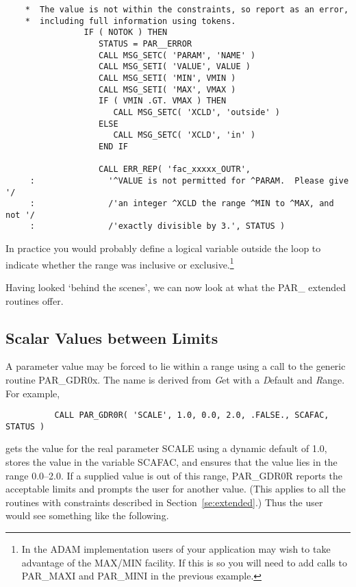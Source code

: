 \documentclass[twoside,11pt]{article}
\newcommand{\xlabel}[1]{}
\newcommand{\dash}{--}
\newcommand{\dash}{-}
\begin{document}
\begin{verbatim}
    *  The value is not within the constraints, so report as an error,
    *  including full information using tokens. 
                IF ( NOTOK ) THEN
                   STATUS = PAR__ERROR
                   CALL MSG_SETC( 'PARAM', 'NAME' )
                   CALL MSG_SETI( 'VALUE', VALUE )
                   CALL MSG_SETI( 'MIN', VMIN )
                   CALL MSG_SETI( 'MAX', VMAX )
                   IF ( VMIN .GT. VMAX ) THEN
                      CALL MSG_SETC( 'XCLD', 'outside' )
                   ELSE
                      CALL MSG_SETC( 'XCLD', 'in' )
                   END IF

                   CALL ERR_REP( 'fac_xxxxx_OUTR',
     :               '^VALUE is not permitted for ^PARAM.  Please give '/
     :               /'an integer ^XCLD the range ^MIN to ^MAX, and not '/
     :               /'exactly divisible by 3.', STATUS )
\end{verbatim}

In practice you would probably define a logical variable outside the loop
to indicate whether the range was inclusive or exclusive.\footnote{In
the ADAM implementation users of your application may wish to take 
advantage of the MAX/MIN facility.  If this is so you will need to add
calls to PAR\_MAXI and PAR\_MINI in the previous example.}

Having looked `behind the scenes', we can now look at what the PAR\_ extended
routines offer.

\subsection{\xlabel{scalar_values_between_limits}Scalar Values between Limits}
\label{se:range}

A parameter value may be forced to lie within a range using a call to
the generic routine PAR\_GDR0x.  The name is derived from {\em G\/}et
with a {\em D\/}efault and {\em R\/}ange.  For example, 

\begin{verbatim}
          CALL PAR_GDR0R( 'SCALE', 1.0, 0.0, 2.0, .FALSE., SCAFAC, STATUS )
\end{verbatim}

gets the value for the real parameter SCALE using a dynamic default of
1.0, stores the value in the variable SCAFAC, and ensures that the value
lies in the range 0.0\dash2.0.  If a supplied value is out of this range,
PAR\_GDR0R reports the acceptable limits and prompts the user for
another value. (This applies to all the routines with constraints
described in Section~\ref{se:extended}.)  Thus the user would see
something like the following. 
\end{document}
